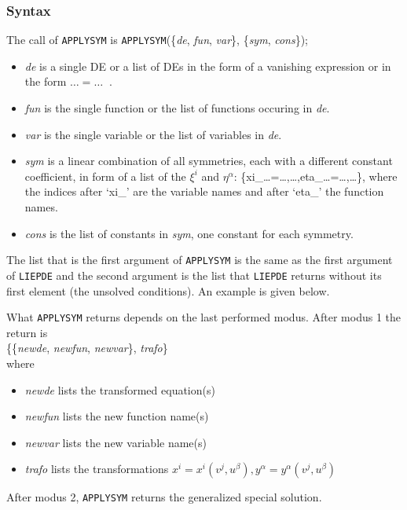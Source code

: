 \subsubsection{Syntax}
The call of \texttt{APPLYSYM} is
\texttt{APPLYSYM}(\{\textit{de}, \textit{fun}, \textit{var}\}, \{\textit{sym}, \textit{cons}\});
\begin{itemize}
\item \textit{de} is a single DE or a list of DEs in the form of a vanishing
      expression or in the form $\ldots=\ldots\;\;$.
\item \textit{fun} is the single function or the list of functions occuring
      in \textit{de}.
\item \textit{var} is the single variable or the list of variables in \textit{de}.
\item \textit{sym} is a linear combination of all symmetries, each with a
      different constant coefficient, in form of a list of the $\xi^i$ and
      $\eta^\alpha$: \{xi\_\ldots=\ldots,\ldots,eta\_\ldots=\ldots,\ldots\},
      where the indices after `xi\_' are the variable names and after `eta\_'
      the function names.
\item \textit{cons} is the list of constants in \textit{sym}, one constant for each
      symmetry.
\end{itemize}
The list that is the first argument of \texttt{APPLYSYM} is the same as the
first argument of \texttt{LIEPDE} and the
second argument is the list that \texttt{LIEPDE} returns without its first
element (the unsolved conditions). An example is given below.

What \texttt{APPLYSYM} returns depends on the last performed modus.
After modus 1 the return is \\
\{\{\textit{newde}, \textit{newfun}, \textit{newvar}\}, \textit{trafo}\} \\
where
\begin{itemize}
\item \textit{newde} lists the transformed equation(s)
\item \textit{newfun} lists the new function name(s)
\item \textit{newvar} lists the new variable name(s)
\item \textit{trafo} lists the transformations $x^i=x^i(v^j,u^\beta),
      y^\alpha=y^\alpha(v^j,u^\beta)$
\end{itemize}
After modus 2, \texttt{APPLYSYM} returns the generalized special solution.
